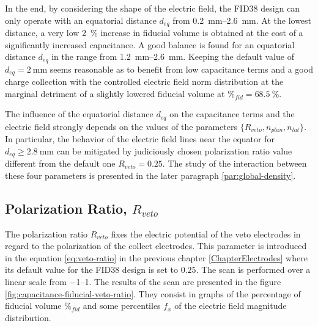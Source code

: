 In the end, by considering the shape of the electric field, the FID38 design can only operate with an equatorial distance $d_{eq}$ from \SIrange{0.2}{2.6}{\mm}. At the lowest distance, a very low \SI{2}{\percent} increase in fiducial volume is obtained at the cost of a significantly increased capacitance. A good balance is found for an equatorial distance $d_{eq}$ in the range from \SIrange{1.2}{2.6}{\mm}. Keeping the default value of $d_{eq} = \SI{2}{\mm}$ seems reasonable as to benefit from low capacitance terms and a good charge collection with the controlled electric field norm distribution at the marginal detriment of a slightly lowered fiducial volume at $\%_{fid}=\SI{68.5}{\percent}$.

The influence of the equatorial distance $d_{eq}$ on the capacitance terms and the electric field strongly depends on the values of the parameters $\{R_{veto}, n_{plan}, n_{lat} \}$. In particular, the behavior of the electric field lines near the equator for $d_{eq} \geq \SI{2.8}{\mm}$ can be mitigated by  judiciously chosen polarization ratio value different from the default one $R_{veto} = \num{0.25}$. The study of the interaction between these four parameters is presented in the later paragraph \ref{par:global-density}.



\subsection{Polarization Ratio, $R_{veto}$}
\label{par:veto-ratio}

The polarization ratio $R_{veto}$ fixes the electric potential of the veto electrodes in regard to the polarization of the collect electrodes. This parameter is introduced in the equation \ref{eq:veto-ratio} in the previous chapter \ref{ChapterElectrodes} where its default value for the FID38 design is set to $0.25$. The scan is performed over a linear scale from \SIrange{-1}{1}{}. The results of the scan are presented in the figure \ref{fig:capacitance-fiducial-veto-ratio}. They consist in graphs of the percentage of fiducial volume $\%_{fid}$ and some percentiles $f_x$ of the electric field magnitude distribution. 

